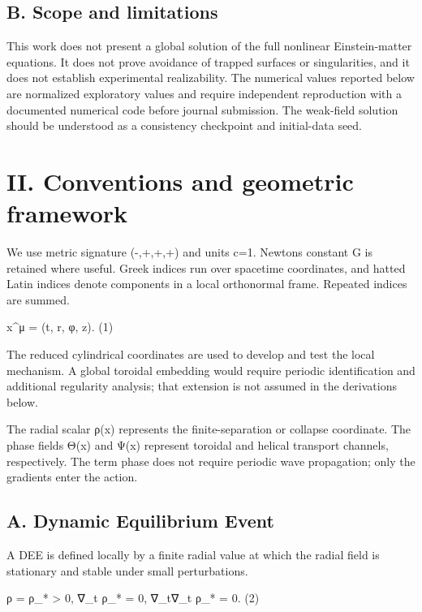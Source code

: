 \subsection{B. Scope and limitations}\label{b.-scope-and-limitations}

This work does not present a global solution of the full nonlinear
Einstein-matter equations. It does not prove avoidance of trapped
surfaces or singularities, and it does not establish experimental
realizability. The numerical values reported below are normalized
exploratory values and require independent reproduction with a
documented numerical code before journal submission. The weak-field
solution should be understood as a consistency checkpoint and
initial-data seed.

\section{II. Conventions and geometric
framework}\label{ii.-conventions-and-geometric-framework}

We use metric signature (-,+,+,+) and units c=1.
Newton\textquotesingle s constant G is retained where useful. Greek
indices run over spacetime coordinates, and hatted Latin indices denote
components in a local orthonormal frame. Repeated indices are summed.

x\^{}μ = (t, r, φ, z). (1)

The reduced cylindrical coordinates are used to develop and test the
local mechanism. A global toroidal embedding would require periodic
identification and additional regularity analysis; that extension is not
assumed in the derivations below.

The radial scalar ρ(x) represents the finite-separation or collapse
coordinate. The phase fields Θ(x) and Ψ(x) represent toroidal and
helical transport channels, respectively. The term phase does not
require periodic wave propagation; only the gradients enter the action.

\subsection{A. Dynamic Equilibrium
Event}\label{a.-dynamic-equilibrium-event}

A DEE is defined locally by a finite radial value at which the radial
field is stationary and stable under small perturbations.

ρ = ρ\_* \textgreater{} 0, ∇\_t ρ\textbar\_* = 0, ∇\_t∇\_t ρ\textbar\_*
= 0. (2)

